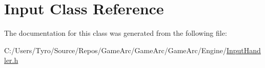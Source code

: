 \hypertarget{class_input}{}\section{Input Class Reference}
\label{class_input}


The documentation for this class was generated from the following file\+:\begin{DoxyCompactItemize}
\item 
C\+:/\+Users/\+Tyro/\+Source/\+Repos/\+Game\+Arc/\+Game\+Arc/\+Game\+Arc/\+Engine/\mbox{\hyperlink{_input_handler_8h}{Input\+Handler.\+h}}\end{DoxyCompactItemize}

